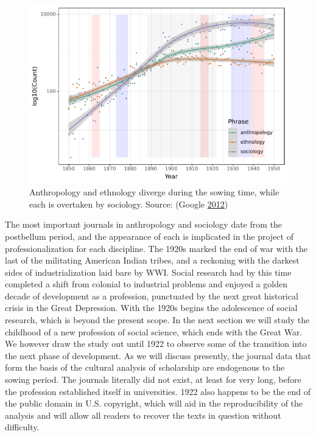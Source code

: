 \documentclass[]{book}
\theoremstyle{definition}
\theoremstyle{definition}
\theoremstyle{definition}
\theoremstyle{remark}
\begin{document}
\begin{figure}

{\centering \includegraphics[width=0.9\linewidth]{04_files/figure-latex/ttseas-1} 

}

\caption{Anthropology and ethnology diverge during the sowing time,
while each is overtaken by sociology. Source: (Google
\protect\hyperlink{ref-2012Google}{2012})}\label{fig:ttseas}
\end{figure}

The most important journals in anthropology and sociology date from the
postbellum period, and the appearance of each is implicated in the
project of professionalization for each discipline. The 1920s marked the
end of war with the last of the militating American Indian tribes, and a
reckoning with the darkest sides of industrialization laid bare by WWI.
Social research had by this time completed a shift from colonial to
industrial problems and enjoyed a golden decade of development as a
profession, punctuated by the next great historical crisis in the Great
Depression. With the 1920s begins the adolescence of social research,
which is beyond the present scope. In the next section we will study the
childhood of a new profession of social science, which ends with the
Great War. We however draw the study out until 1922 to observe some of
the transition into the next phase of development. As we will discuss
presently, the journal data that form the basis of the cultural analysis
of scholarship are endogenous to the sowing period. The journals
literally did not exist, at least for very long, before the profession
established itself in universities. 1922 also happens to be the end of
the public domain in U.S. copyright, which will aid in the
reproducibility of the analysis and will allow all readers to recover
the texts in question without difficulty.
\end{document}
